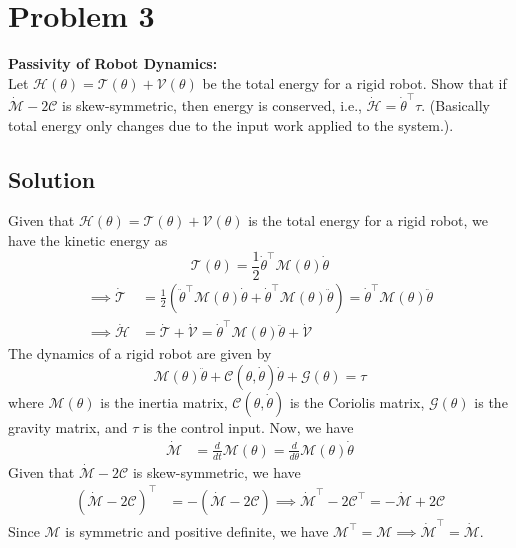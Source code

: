 \section*{Problem 3}
\setcounter{section}{3}
\setcounter{equation}{0}

\textbf{Passivity of Robot Dynamics:} \\
Let \( \mathcal{H}(\theta)=\mathcal{T}(\theta)+\mathcal{V}(\theta) \) be the total energy for a rigid robot.
Show that if \( \dot{\mathcal{M}}-2 \mathcal{C} \) is skew-symmetric, then energy is conserved, i.e., \( \dot{\mathcal{H}}=\dot{\theta}^{\top} \tau \).
(Basically total energy only changes due to the input work applied to the system.).

\subsection*{Solution}

Given that \( \mathcal{H}(\theta)=\mathcal{T}(\theta)+\mathcal{V}(\theta) \) is the total energy for a rigid robot, we have the kinetic energy as
\begin{equation*}
    \mathcal{T}(\theta)
    =
    \frac{1}{2} \dot{\theta}^{\top} \mathcal{M}(\theta) \dot{\theta}
\end{equation*}
\begin{align*}
    \implies
    \dot{\mathcal{T}}
     & =
    \frac{1}{2} \left( \ddot{\theta}^{\top} \mathcal{M}(\theta) \dot{\theta}+\dot{\theta}^{\top} \mathcal{M}(\theta) \ddot{\theta} \right)
    =
    \dot{\theta}^{\top} \mathcal{M}(\theta) \ddot{\theta}
    \\
    \implies
    \dot{\mathcal{H}}
     & =
    \dot{\mathcal{T}}+\dot{\mathcal{V}}
    =
    \dot{\theta}^{\top} \mathcal{M}(\theta) \ddot{\theta}+\dot{\mathcal{V}}
\end{align*}
The dynamics of a rigid robot are given by
\begin{equation*}
    \mathcal{M}(\theta) \ddot{\theta}+\mathcal{C}(\theta, \dot{\theta}) \dot{\theta}+\mathcal{G}(\theta)=\tau
\end{equation*}
where \( \mathcal{M}(\theta) \) is the inertia matrix, \( \mathcal{C}(\theta, \dot{\theta}) \) is the Coriolis matrix, \( \mathcal{G}(\theta) \) is the gravity matrix, and \( \tau \) is the control input.
Now, we have
\begin{align*}
    \dot{\mathcal{M}}
     & =
    \frac{d}{d t} \mathcal{M}(\theta)
    =
    \frac{d}{d \theta} \mathcal{M}(\theta) \dot{\theta}
\end{align*}
Given that \( \dot{\mathcal{M}}-2 \mathcal{C} \) is skew-symmetric, we have
\begin{align*}
    \left( \dot{\mathcal{M}}-2 \mathcal{C} \right)^{\top}
     & =
    -\left( \dot{\mathcal{M}}-2 \mathcal{C} \right)
    \implies
    \dot{\mathcal{M}}^{\top}-2 \mathcal{C}^{\top}
    =
    -\dot{\mathcal{M}}+2 \mathcal{C}
\end{align*}
Since \( \mathcal{M} \) is symmetric and positive definite, we have \( {\mathcal{M}}^{\top} = \mathcal{M} \implies \dot{\mathcal{M}}^{\top} = \dot{\mathcal{M}} \).
